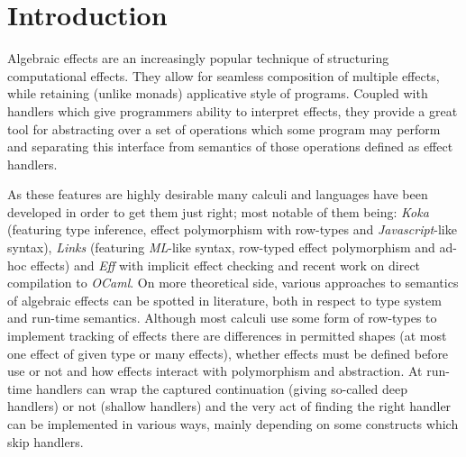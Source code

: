 \documentclass[inz, english, shortabstract]{iithesis}
\author         {Maciej Buszka}
\begin{document}
%
\chapter{Introduction}
% 
%
%
%
Algebraic effects \cite{Plotkin2003} are an increasingly popular technique of structuring computational effects.
They allow for seamless composition of multiple effects, while retaining (unlike monads) applicative style of programs.
Coupled with handlers \cite{Plotkin2013} which give programmers ability to interpret effects, they provide a great tool for abstracting over a set of operations which some program may perform and separating this interface from semantics of those operations defined as effect handlers.

As these features are highly desirable many calculi and languages have been developed in order to get them just right; most notable of them being: \emph{Koka}\cite{Leijen2014} (featuring type inference, effect polymorphism with row-types and \emph{Javascript}-like syntax), \emph{Links}\cite{Hillerstrom2016} (featuring \emph{ML}-like syntax, row-typed effect polymorphism and ad-hoc effects) and \emph{Eff}\cite{Bauer2012} with implicit effect checking and recent work on direct compilation to \emph{OCaml}\cite{Kiselyov2018}.
On more theoretical side, various approaches to semantics of algebraic effects can be spotted in literature, both in respect to type system and run-time semantics.
Although most calculi use some form of row-types to implement tracking of effects there are differences in permitted shapes (at most one effect of given type or many effects), whether effects must be defined before use or not and how effects interact with polymorphism and abstraction.
At run-time handlers can wrap the captured continuation (giving so-called deep handlers) or not (shallow handlers) and the very act of finding the right handler can be implemented in various ways, mainly depending on some constructs which skip handlers.
\end{document}
